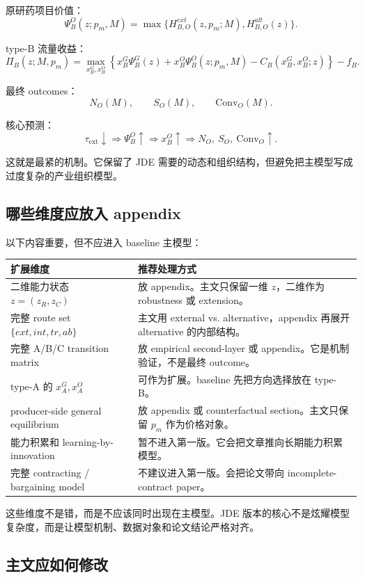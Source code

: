 \documentclass[12pt]{article}
\newcommand{\tauext}{\tau_{\mathrm{ext}}}
\newcommand{\Conv}{\mathrm{Conv}}
\begin{document}
原研药项目价值：
\[
\Psi_B^O(z;p_m,M)
=
\max\{H_{B,O}^{ext}(z,p_m;M),H_{B,O}^{alt}(z)\}.
\]

type-B 流量收益：
\[
\Pi_B(z;M,p_m)
=
\max_{x_B^G,x_B^O}\left\{
 x_B^G\Psi_B^G(z)
+x_B^O\Psi_B^O(z;p_m,M)
-C_B(x_B^G,x_B^O;z)
\right\}-f_B.
\]

最终 outcomes：
\[
N_O(M),\qquad S_O(M),\qquad \Conv_O(M).
\]

核心预测：
\[
\tauext\downarrow
\Rightarrow
\Psi_B^O\uparrow
\Rightarrow
x_B^O\uparrow
\Rightarrow
N_O,\ S_O,\ \Conv_O\uparrow.
\]

这就是最紧的机制。它保留了 JDE 需要的动态和组织结构，但避免把主模型写成过度复杂的产业组织模型。

\subsection{哪些维度应放入 appendix}

以下内容重要，但不应进入 baseline 主模型：

\begin{longtable}{p{}p{}}
\toprule
扩展维度 & 推荐处理方式 \\
\midrule
二维能力状态 $z=(z_R,z_C)$ & 放 appendix。主文只保留一维 $z$，二维作为 robustness 或 extension。 \\
\addlinespace
完整 route set $\{ext,int,tr,ab\}$ & 主文用 external vs. alternative，appendix 再展开 alternative 的内部结构。 \\
\addlinespace
完整 A/B/C transition matrix & 放 empirical second-layer 或 appendix。它是机制验证，不是最终 outcome。 \\
\addlinespace
type-A 的 $x_A^G,x_A^O$ & 可作为扩展。baseline 先把方向选择放在 type-B。 \\
\addlinespace
producer-side general equilibrium & 放 appendix 或 counterfactual section。主文只保留 $p_m$ 作为价格对象。 \\
\addlinespace
能力积累和 learning-by-innovation & 暂不进入第一版。它会把文章推向长期能力积累模型。 \\
\addlinespace
完整 contracting / bargaining model & 不建议进入第一版。会把论文带向 incomplete-contract paper。 \\
\bottomrule
\end{longtable}

这些维度不是错，而是不应该同时出现在主模型。JDE 版本的核心不是炫耀模型复杂度，而是让模型机制、数据对象和论文结论严格对齐。

\subsection{主文应如何修改}
\end{document}
